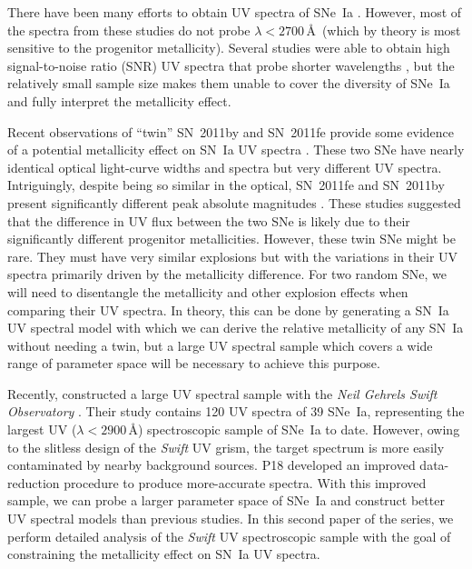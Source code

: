 \documentclass[useAMS,usenatbib]{mn2e}
\begin{document}
There have been many efforts to obtain UV spectra of SNe~Ia \citep[e.g.,][]{1993ApJ...415..589K,2008ApJ...674...51E,2008ApJ...686..117F,2012MNRAS.426.2359M}. However, most of the spectra from these studies do not probe $\lambda<2700$\,\AA\ (which by theory is most sensitive to the progenitor metallicity). Several studies were able to obtain high signal-to-noise ratio (SNR) UV spectra that probe shorter wavelengths \citep[down to $\sim1800$\,\AA; e.g.,][]{2012ApJ...753L...5F,2014MNRAS.439.1959M,2014MNRAS.443.2887F,2015MNRAS.452.4307P,2016MNRAS.461.1308F}, but the relatively small sample size makes them unable to cover the diversity of SNe~Ia and fully interpret the metallicity effect.

Recent observations of ``twin'' SN~2011by and SN~2011fe provide some evidence of a potential metallicity effect on SN~Ia UV spectra \citep{2013ApJ...769L...1F,2015MNRAS.446.2073G,2018arXiv180608359F}. These two SNe have nearly identical optical light-curve widths and spectra but very different UV spectra. Intriguingly, despite being so similar in the optical, SN~2011fe and SN~2011by present significantly different peak absolute magnitudes \citep[$\Delta M_{V}=0.335\pm0.069$\,mag;][]{2018arXiv180608359F}. These studies suggested that the difference in UV flux between the two SNe is likely due to their significantly different progenitor metallicities. However, these twin SNe might be rare. They must have very similar explosions but with the variations in their UV spectra primarily driven by the metallicity difference. For two random SNe, we will need to disentangle the metallicity and other explosion effects when comparing their UV spectra. In theory, this can be done by generating a SN~Ia UV spectral model with which we can derive the relative metallicity of any SN~Ia without needing a twin, but a large UV spectral sample which covers a wide range of parameter space will be necessary to achieve this purpose.

Recently, \citet[][hereafter P18]{2018MNRAS.479..517P} constructed a large UV spectral sample with the {\it Neil Gehrels Swift Observatory} \citep{2004ApJ...611.1005G}. Their study contains 120 UV spectra of 39 SNe~Ia, representing the largest UV ($\lambda<2900$\,\AA) spectroscopic sample of SNe~Ia to date. However, owing to the slitless design of the {\it Swift} UV grism, the target spectrum is more easily contaminated by nearby background sources. P18 developed an improved data-reduction procedure to produce more-accurate spectra. With this improved sample, we can probe a larger parameter space of SNe~Ia and construct better UV spectral models than previous studies. In this second paper of the series, we perform detailed analysis of the {\it Swift} UV spectroscopic sample with the goal of constraining the metallicity effect on SN~Ia UV spectra.
\end{document}
